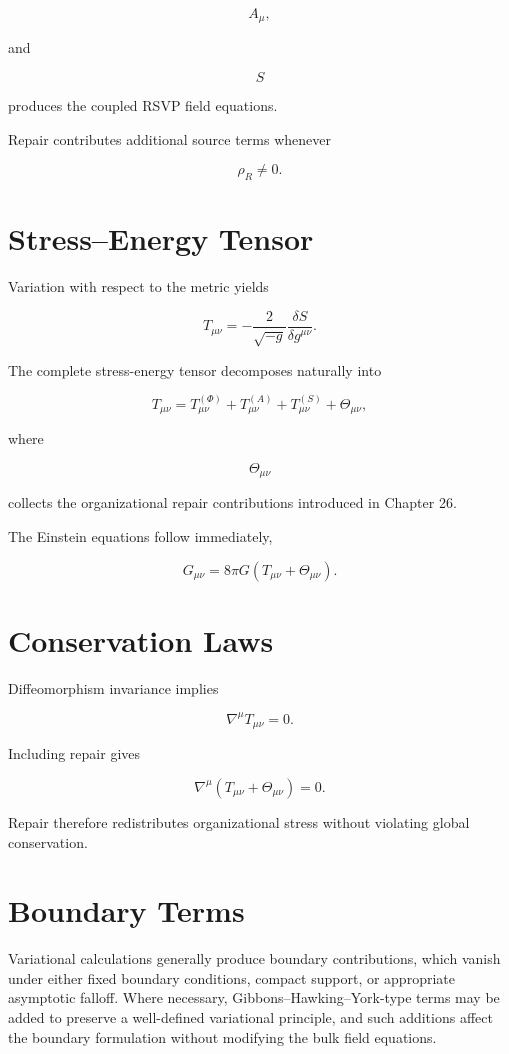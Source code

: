 \documentclass[11pt,oneside]{book}
\numberwithin{equation}{chapter}
\theoremstyle{definition}
\theoremstyle{plain}
\begin{document}
\[
A_\mu,
\]

and

\[
S
\]

produces the coupled RSVP field equations.

Repair contributes additional source terms whenever

\[
\rho_R
\neq
0.
\]

\section{Stress--Energy Tensor}

Variation with respect to the metric yields

\[
T_{\mu\nu}
=
-
\frac{2}{\sqrt{-g}}
\frac{\delta S}
{\delta g^{\mu\nu}}.
\]

The complete stress-energy tensor decomposes naturally into

\[
T_{\mu\nu}
=
T^{(\Phi)}_{\mu\nu}
+
T^{(A)}_{\mu\nu}
+
T^{(S)}_{\mu\nu}
+
\Theta_{\mu\nu},
\]

where

\[
\Theta_{\mu\nu}
\]

collects the organizational repair contributions introduced in Chapter 26.

The Einstein equations follow immediately,

\[
G_{\mu\nu}
=
8\pi G
\left(
T_{\mu\nu}
+
\Theta_{\mu\nu}
\right).
\]

\section{Conservation Laws}

Diffeomorphism invariance implies

\[
\nabla^\mu
T_{\mu\nu}
=
0.
\]

Including repair gives

\[
\nabla^\mu
\left(
T_{\mu\nu}
+
\Theta_{\mu\nu}
\right)
=
0.
\]

Repair therefore redistributes organizational stress without violating
global conservation.

\section{Boundary Terms}

Variational calculations generally produce boundary contributions, which vanish under either fixed boundary conditions, compact support, or appropriate asymptotic falloff. Where necessary, Gibbons--Hawking--York-type terms may be added to preserve a well-defined variational principle, and such additions affect the boundary formulation without modifying the bulk field equations.
\end{document}
